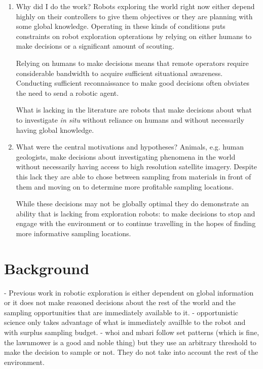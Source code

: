 \documentclass[preprint,12pt,3p]{elsarticle}
\begin{document}
\begin{enumerate}
\item Why did I do the work?
	Robots exploring the world right now either depend highly on their controllers to give them objectives or they are planning with some global knowledge.  Operating in these kinds of conditions puts constraints on robot exploration opterations by relying on either humans to make decisions or a significant amount of scouting.

	Relying on humans to make decisions means that remote operators require considerable bandwidth to acquire sufficient situational awareness.  Conducting sufficient reconnaissance to make good decisions often obviates the need to send a robotic agent.

	What is lacking in the literature are robots that make decisions about what to investigate \emph{in situ} without reliance on humans and without necessarily having global knowledge.
	\item What were the central motivations and hypotheses?
	Animals, e.g. human geologists, make decisions about investigating phenomena in the world without necessarily having access to high resolution satellite imagery.  Despite this lack they are able to chose between sampling from materials in front of them and moving on to determine more profitable sampling locations.

	While these decisions may not be globally optimal they do demonstrate an ability that is lacking from exploration robots: to make decisions to stop and engage with the environment or to continue travelling in the hopes of finding more informative sampling locations.
	\end{enumerate}


\section{Background}
\label{sec:background}

	- Previous work in robotic exploration is either dependent on global information or it does not make reasoned decisions about the rest of the world and the sampling opportunities that are immediately available to it.
			- opportunistic science only takes advantage of what is immediately availble to the robot and with surplus sampling budget.
			- whoi and mbari follow set patterns (which is fine, the lawnmower is a good and noble thing) but they use an arbitrary threshold to make the decision to sample or not.  They do not take into account the rest of the environment.
\end{document}
